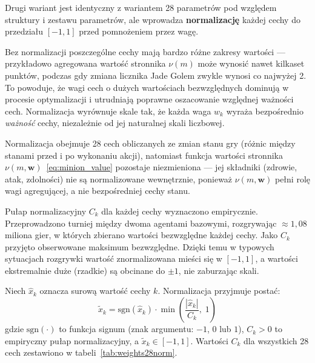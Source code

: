 Drugi wariant jest identyczny z wariantem 28 parametrów pod względem struktury i zestawu parametrów, ale wprowadza \textbf{normalizację} każdej cechy do przedziału $[-1, 1]$ przed pomnożeniem przez wagę.

Bez normalizacji poszczególne cechy mają bardzo różne zakresy wartości --- przykładowo agregowana wartość stronnika $\nu(m)$ może wynosić nawet kilkaset punktów, podczas gdy zmiana licznika Jade Golem zwykle wynosi co najwyżej 2. To powoduje, że wagi cech o dużych wartościach bezwzględnych dominują w procesie optymalizacji i utrudniają poprawne oszacowanie względnej ważności cech. Normalizacja wyrównuje skale tak, że każda waga $w_k$ wyraża bezpośrednio \emph{ważność} cechy, niezależnie od jej naturalnej skali liczbowej.

Normalizacja obejmuje 28 cech obliczanych ze zmian stanu gry (różnic między stanami przed i po wykonaniu akcji), natomiast funkcja wartości stronnika $\nu(m, \mathbf{w})$~\eqref{eq:minion_value} pozostaje niezmieniona --- jej składniki (zdrowie, atak, zdolności) nie są normalizowane wewnętrznie, ponieważ $\nu(m, \mathbf{w})$ pełni rolę wagi agregującej, a nie bezpośredniej cechy stanu.

Pułap normalizacyjny $C_k$ dla każdej cechy wyznaczono empirycznie. Przeprowadzono turniej między dwoma agentami bazowymi, rozgrywając $\approx1,08$ miliona gier, w których zbierano wartości bezwzględne każdej cechy. Jako $C_k$ przyjęto obserwowane maksimum bezwzględne. Dzięki temu w typowych sytuacjach rozgrywki wartość znormalizowana mieści się w $[-1, 1]$, a wartości ekstremalnie duże (rzadkie) są obcinane do $\pm 1$, nie zaburzając skali.

Niech $\hat{x}_k$ oznacza surową wartość cechy $k$. Normalizacja przyjmuje postać:
\begin{equation}
    \tilde{x}_k = \text{sgn}(\hat{x}_k) \cdot \min\!\left(\frac{|\hat{x}_k|}{C_k},\; 1\right)
    \label{eq:normalize}
\end{equation}
gdzie $\text{sgn}(\cdot)$ to funkcja signum (znak argumentu: $-1$, $0$ lub $1$), $C_k > 0$ to empiryczny pułap normalizacyjny, a $\tilde{x}_k \in [-1, 1]$. Wartości $C_k$ dla wszystkich 28 cech zestawiono w tabeli~\ref{tab:weights28norm}.




